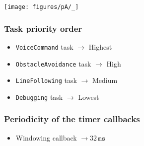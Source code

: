 \vspace*{-1em}
\begin{figure*}[htbp]
    \centering
    \begin{minipage}{0.45\linewidth}
        \centering
        \texttt{[image: figures/pA/\_]}
    \end{minipage}
    \hfill
    \begin{minipage}{0.49\linewidth}
        \subsubsection*{Task priority order}
        \vspace*{-1em}
        \begin{itemize}[noitemsep, topsep=0pt, partopsep=0pt, parsep=0pt]
            \item \texttt{VoiceCommand} task \( \to \) Highest
            \item \texttt{ObstacleAvoidance} task \( \to \) High
            \item \texttt{LineFollowing} task \( \to \) Medium
            \item \texttt{Debugging} task \( \to \) Lowest
        \end{itemize}

        \subsubsection*{Periodicity of the timer callbacks}
        \vspace*{-1em}
        \begin{itemize}[noitemsep, topsep=0pt, partopsep=0pt, parsep=0pt]
            \item Windowing callback \( \to 32\,\texttt{ms} \)
        \end{itemize}
    \end{minipage}
\end{figure*}
